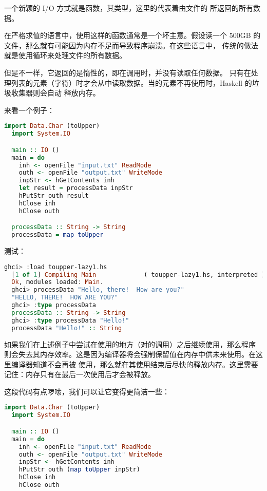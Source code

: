 \documentclass[./main.tex]{subfiles}
\begin{document}
一个新颖的 I/O 方式就是函数，其类型，这里的代表着由文件的
所返回的所有数据。

在严格求值的语言中，使用这样的函数通常是一个坏主意。假设读一个 500GB 的文件，那么就有可能因为内存不足而导致程序崩溃。在这些语言中，
传统的做法就是使用循环来处理文件的所有数据。

但是不一样，它返回的是惰性的，即在调用时，并没有读取任何数据。
只有在处理列表的元素（字符）时才会从中读取数据。当的元素不再使用时，Haskell 的垃圾收集器则会自动
释放内存。

来看一个例子：

\begin{lstlisting}[language=Haskell]
  import Data.Char (toUpper)
  import System.IO

  main :: IO ()
  main = do
    inh <- openFile "input.txt" ReadMode
    outh <- openFile "output.txt" WriteMode
    inpStr <- hGetContents inh
    let result = processData inpStr
    hPutStr outh result
    hClose inh
    hClose outh

  processData :: String -> String
  processData = map toUpper
\end{lstlisting}

测试：

\begin{lstlisting}[language=Haskell]
  ghci> :load toupper-lazy1.hs
  [1 of 1] Compiling Main             ( toupper-lazy1.hs, interpreted )
  Ok, modules loaded: Main.
  ghci> processData "Hello, there!  How are you?"
  "HELLO, THERE!  HOW ARE YOU?"
  ghci> :type processData
  processData :: String -> String
  ghci> :type processData "Hello!"
  processData "Hello!" :: String
\end{lstlisting}

\begin{awarn}
  如果我们在上述例子中尝试在使用的地方（对的调用）之后继续使用，那么程序
  则会失去其内存效率。这是因为编译器将会强制保留值在内存中供未来使用。在这里编译器知道不会再被
  使用，那么就在其使用结束后尽快的释放内存。这里需要记住：内存只有在最后一次使用后才会被释放。
\end{awarn}

这段代码有点啰嗦，我们可以让它变得更简洁一些：

\begin{lstlisting}[language=Haskell]
  import Data.Char (toUpper)
  import System.IO

  main :: IO ()
  main = do
    inh <- openFile "input.txt" ReadMode
    outh <- openFile "output.txt" WriteMode
    inpStr <- hGetContents inh
    hPutStr outh (map toUpper inpStr)
    hClose inh
    hClose outh
\end{lstlisting}
\end{document}
